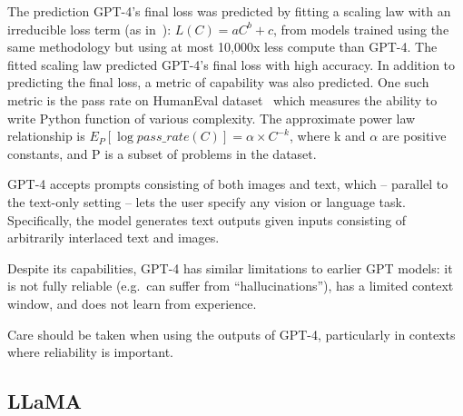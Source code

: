 The prediction GPT-4’s final loss was predicted by fitting a scaling law with an irreducible loss term (as in~\cite{henighan2020scaling}): \(L(C) = aC^b + c\), from models trained using the same methodology but using at most 10,000x less compute than GPT-4.
The fitted scaling law predicted GPT-4’s final loss with high accuracy.
In addition to predicting the final loss, a metric of capability was also predicted.
One such metric is the pass rate on HumanEval dataset~\cite{chen2021evaluating} which measures the ability to write Python function of various complexity.
The approximate power law relationship is \(E_P [\log{pass\_rate(C)}] = \alpha \times C^{-k}\), where k and \(\alpha\) are positive constants, and P is a subset of problems in the dataset.

GPT-4 accepts prompts consisting of both images and text, which -- parallel to the text-only setting -- lets the user specify any vision or language task.
Specifically, the model generates text outputs given inputs consisting of arbitrarily interlaced text and images.

Despite its capabilities, GPT-4 has similar limitations to earlier GPT models: it is not fully reliable (e.g.\ can suffer from \enquote{hallucinations}), has a limited context window, and does not learn from experience.

Care should be taken when using the outputs of GPT-4, particularly in contexts where reliability is important.

\subsection{LLaMA}
\label{subsec:llama}

